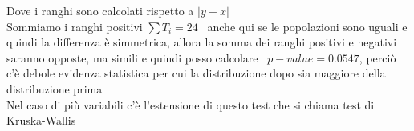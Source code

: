 Dove i ranghi sono calcolati rispetto a $|y-x|$\\

Sommiamo i ranghi positivi $\sum T_i = 24$ \ anche qui se le popolazioni sono uguali e quindi la differenza è simmetrica, allora la somma dei ranghi positivi e negativi saranno opposte, ma simili e quindi posso calcolare \ $p-value = 0.0547$, perciò c'è debole evidenza statistica per cui la distribuzione dopo sia maggiore della distribuzione prima\\


Nel caso di più variabili c'è l'estensione di questo test che si chiama test di Kruska-Wallis